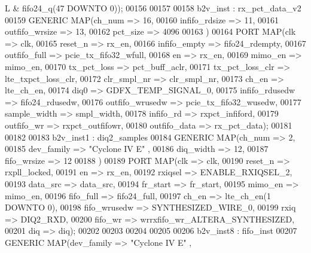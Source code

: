 \begin{DoxyCode}
{      L} \textcolor{vhdlchar}{&} \textcolor{vhdlchar}{fifo24_q}\textcolor{vhdlchar}{(}\textcolor{vhdllogic}{}\textcolor{vhdllogic}{47} \textcolor{keywordflow}{DOWNTO} \textcolor{vhdllogic}{}\textcolor{vhdllogic}{0}\textcolor{vhdlchar}{)}\textcolor{vhdlchar}{)};
00156 
00157 
00158 b2v_inst : rx_pct_data_v2
00159 \textcolor{keywordflow}{GENERIC} \textcolor{keywordflow}{MAP}(ch_num => \textcolor{vhdllogic}{16},
00160             infifo_rdsize => \textcolor{vhdllogic}{11},
00161             outfifo_wrsize => \textcolor{vhdllogic}{13},
00162             pct_size => \textcolor{vhdllogic}{4096}
00163             \textcolor{vhdlchar}{)}
00164 \textcolor{keywordflow}{PORT} \textcolor{keywordflow}{MAP}(clk => clk,
00165          reset_n => rx_en,
00166          infifo_empty => fifo24_rdempty,
00167          outfifo_full => pcie_tx_fifo32_wfull,
00168          en => rx_en,
00169          mimo_en => mimo_en,
00170          tx_pct_loss => pct_buff_aclr,
00171          tx_pct_loss_clr => lte_txpct_loss_clr,
00172          clr_smpl_nr => clr_smpl_nr,
00173          ch_en => lte_ch_en,
00174          diq0 => GDFX_TEMP_SIGNAL_0,
00175          infifo_rdusedw => fifo24_rdusedw,
00176          outfifo_wrusedw => pcie_tx_fifo32_wusedw,
00177          sample_width => smpl_width,
00178          infifo_rd => rxpct_infiford,
00179          outfifo_wr => rxpct_outfifowr,
00180          outfifo_data => rx_pct_data\textcolor{vhdlchar}{)};
00181 
00182 
00183 b2v_inst1 : diq2_samples
00184 \textcolor{keywordflow}{GENERIC} \textcolor{keywordflow}{MAP}(ch_num => \textcolor{vhdllogic}{2},
00185             dev_family => \textcolor{keyword}{"Cyclone IV E"}  ,
00186             diq_width => \textcolor{vhdllogic}{12},
00187             fifo_wrsize => \textcolor{vhdllogic}{12}
00188             \textcolor{vhdlchar}{)}
00189 \textcolor{keywordflow}{PORT} \textcolor{keywordflow}{MAP}(clk => clk,
00190          reset_n => rxpll_locked,
00191          en => rx_en,
00192          rxiqsel => ENABLE_RXIQSEL_2,
00193          data_src => data_src,
00194          fr_start => fr_start,
00195          mimo_en => mimo_en,
00196          fifo_full => fifo24_full,
00197          ch_en => lte_ch_en\textcolor{vhdlchar}{(}\textcolor{vhdllogic}{1} \textcolor{keywordflow}{DOWNTO} \textcolor{vhdllogic}{0}\textcolor{vhdlchar}{)},
00198          fifo_wrusedw => SYNTHESIZED_WIRE_0,
00199          rxiq => DIQ2_RXD,
00200          fifo_wr => wrrxfifo_wr_ALTERA_SYNTHESIZED,
00201          diq => diq\textcolor{vhdlchar}{)};
00202 
00203 
00204 
00205 
00206 b2v_inst8 : fifo_inst
00207 \textcolor{keywordflow}{GENERIC} \textcolor{keywordflow}{MAP}(dev_family => \textcolor{keyword}{"Cyclone IV E"}  ,

\end{DoxyCode}
